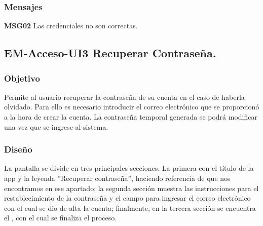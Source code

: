 \subsubsection{Mensajes}
	
	\begin{Citemize}
		\item {\bf MSG02} Las credenciales no son correctas.
	\end{Citemize}





\subsection{EM-Acceso-UI3 Recuperar Contraseña.}

\subsubsection{Objetivo}
	\noindent
	Permite al usuario recuperar la contraseña de su cuenta en el caso de haberla olvidado. Para ello
	es necesario introducir el correo electrónico que se proporcionó a la hora de crear la cuenta. 
	La contraseña temporal generada se podrá modificar una vez que se ingrese al sistema.

\subsubsection{Diseño}
	\noindent
	La pantalla se divide en tres principales secciones. La primera con el título de la app y la
	leyenda ''Recuperar contraseña'', haciendo referencia de que nos encontramos en ese apartado; la
	segunda sección muestra las instrucciones para el restablecimiento de la contraseña y el campo
	para ingresar el correo electrónico con el cual se dio de alta la cuenta; finalmente, en la tercera
	sección se encuentra el , con el cual se finaliza el proceso.

\pagebreak
{}

